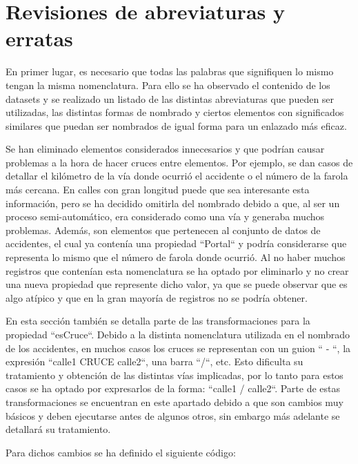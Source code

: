 
\section{Revisiones de abreviaturas y erratas}


En primer lugar, es necesario que todas las palabras que signifiquen lo mismo tengan la misma nomenclatura. Para ello se ha observado el contenido de los datasets y se realizado un listado de las distintas abreviaturas que pueden ser utilizadas, las distintas formas de nombrado y ciertos elementos con significados similares que puedan ser nombrados de igual forma para un enlazado más eficaz.

Se han eliminado elementos considerados innecesarios y que podrían causar problemas a la hora de hacer cruces entre elementos. Por ejemplo, se dan casos de detallar el kilómetro de la vía donde ocurrió el accidente o el número de la farola más cercana. En calles con gran longitud puede que sea interesante esta información, pero se ha decidido omitirla del nombrado debido a que, al ser un proceso semi-automático, era considerado como una vía y generaba muchos problemas. Además, son elementos que pertenecen al conjunto de datos de accidentes, el cual ya contenía una propiedad ``Portal`` y podría considerarse que representa lo mismo que el número de farola donde ocurrió. Al no haber muchos registros que contenían esta nomenclatura se ha optado por eliminarlo y no crear una nueva propiedad que represente dicho valor, ya que se puede observar que es algo atípico y que en la gran mayoría de registros no se podría obtener.

En esta sección también se detalla parte de las transformaciones para la propiedad ``esCruce``. Debido a la distinta nomenclatura utilizada en el nombrado de los accidentes, en muchos casos los cruces se representan con un guion `` - ``, la expresión ``calle1 CRUCE calle2``, una barra ``/``, etc. Esto dificulta su tratamiento y obtención de las distintas vías implicadas, por lo tanto para estos casos se ha optado por expresarlos de la forma: ``calle1 / calle2``. Parte de estas transformaciones se encuentran en este apartado debido a que son cambios muy básicos y deben ejecutarse antes de algunos otros, sin embargo más adelante se detallará su tratamiento.









Para dichos cambios se ha definido el siguiente código:

